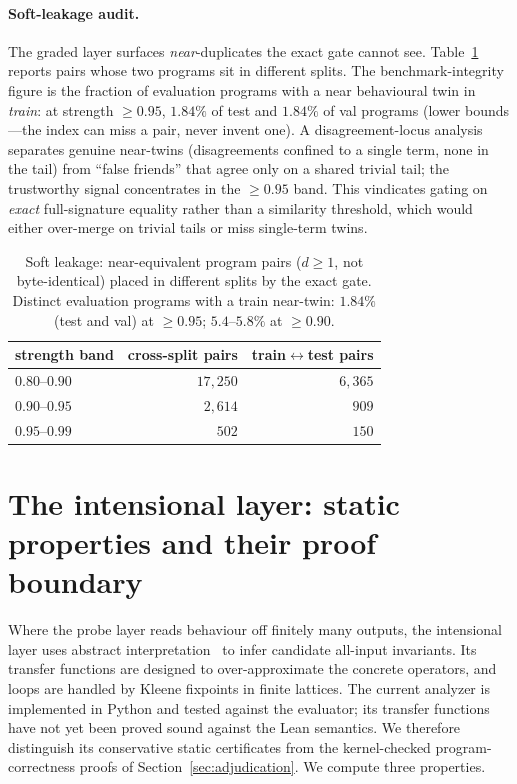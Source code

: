 \documentclass[11pt]{article}
\begin{document}
\paragraph{Soft-leakage audit.} The graded layer surfaces \emph{near}-duplicates the exact
gate cannot see. Table~\ref{tab:leak} reports pairs whose two programs sit in different
splits. The benchmark-integrity figure is the fraction of evaluation programs with a near
behavioural twin in \emph{train}: at strength $\ge 0.95$, $1.84\%$ of test and $1.84\%$ of
val programs (lower bounds---the index can miss a pair, never invent one). A
disagreement-locus analysis separates genuine near-twins (disagreements confined to a
single term, none in the tail) from ``false friends'' that agree only on a shared trivial
tail; the trustworthy signal concentrates in the $\ge 0.95$ band. This vindicates gating on
\emph{exact} full-signature equality rather than a similarity threshold, which would either
over-merge on trivial tails or miss single-term twins.

\begin{table}[t]
\centering
\begin{tabular}{@{}lrr@{}}
\toprule
strength band & cross-split pairs & train$\leftrightarrow$test pairs \\
\midrule
$0.80$--$0.90$ & $17{,}250$ & $6{,}365$ \\
$0.90$--$0.95$ & $2{,}614$  & $909$ \\
$0.95$--$0.99$ & $502$      & $150$ \\
\bottomrule
\end{tabular}
\caption{Soft leakage: near-equivalent program pairs ($d\ge 1$, not byte-identical) placed
in different splits by the exact gate. Distinct evaluation programs with a train near-twin:
$1.84\%$ (test and val) at $\ge 0.95$; $5.4$--$5.8\%$ at $\ge 0.90$.}
\label{tab:leak}
\end{table}

\section{The intensional layer: static properties and their proof boundary}
\label{sec:intensional}

Where the probe layer reads behaviour off finitely many outputs, the intensional layer
uses abstract interpretation~\cite{cousot1977} to infer candidate all-input invariants.
Its transfer functions are designed to over-approximate the concrete operators, and loops
are handled by Kleene fixpoints in finite lattices. The current analyzer is implemented in
Python and tested against the evaluator; its transfer functions have not yet been proved
sound against the Lean semantics. We therefore distinguish its conservative static
certificates from the kernel-checked program-correctness proofs of
Section~\ref{sec:adjudication}. We compute three properties.
\end{document}
